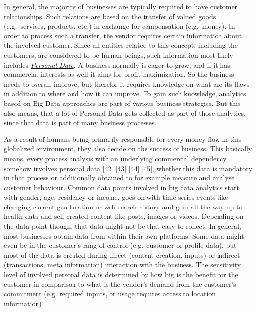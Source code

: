 \documentclass[12pt,english,a4paper,titlepage,cleardoublepage=empty,dottedtoc]{report}
\begin{document}
In general, the majority of businesses are typically required to have
customer relationships. Such relations are based on the transfer of
valued goods (e.g.~services, products, etc.) in exchange for
compensation (e.g.~money). In order to process such a transfer, the
vendor requires certain information about the involved customer. Since
all entities related to this concept, including the customers, are
considered to be human beings, such information most likely includes
\emph{\protect\hyperlink{digital-identity-personal-data-and-ownership}{Personal
Data}}. A business normally is eager to grow, and if it has commercial
interests as well it aims for profit maximization. So the business needs
to overall improve, but therefor it requires knowledge on what are its
flaws in addition to where and how it can improve. To gain such
knowledge, analytics based on Big Data approaches are part of various
business strategies. But this also means, that a lot of Personal Data
gets collected as part of those analytics, since that data is part of
many business processes.

As a result of humans being primarily responsible for every money flow
in this globalized environment, they also decide on the success of
business. This basically means, every process analysis with an
underlying commercial dependency somehow involves personal data
{[}\protect\hyperlink{ref-web_2016_facebook-utilizes-98-data-points}{42}{]}
{[}\protect\hyperlink{ref-web_2016_big-data-types-of-data-used-in-analytics}{43}{]}
{[}\protect\hyperlink{ref-book-chapter_1999_Principles-of-knowledge-discovery-in-databases_introduction-to-data-mining}{44}{]}
{[}\protect\hyperlink{ref-web_2013_big-data-collection-collides-with-privacy-concerns}{45}{]},
whether this data is mandatory in that process or additionally obtained
to for example measure and analyse customer behaviour. Common data
points involved in big data analytics start with gender, age, residency
or income, goes on with time series events like changing current
geo-location or web search history and goes all the way up to health
data and self-created content like posts, images or videos. Depending on
the data point though, that data might not be that easy to collect. In
general, most businesses obtain data from within their own platforms.
Some data might even be in the customer's rang of control (e.g.~customer
or profile data), but most of the data is created during direct (content
creation, inputs) or indirect (transactions, meta information)
interaction with the business. The sensitivity level of involved
personal data is determined by how big is the benefit for the customer
in comparison to what is the vendor's demand from the customer's
commitment (e.g. required inputs, or usage requires access to location
information)
\end{document}
